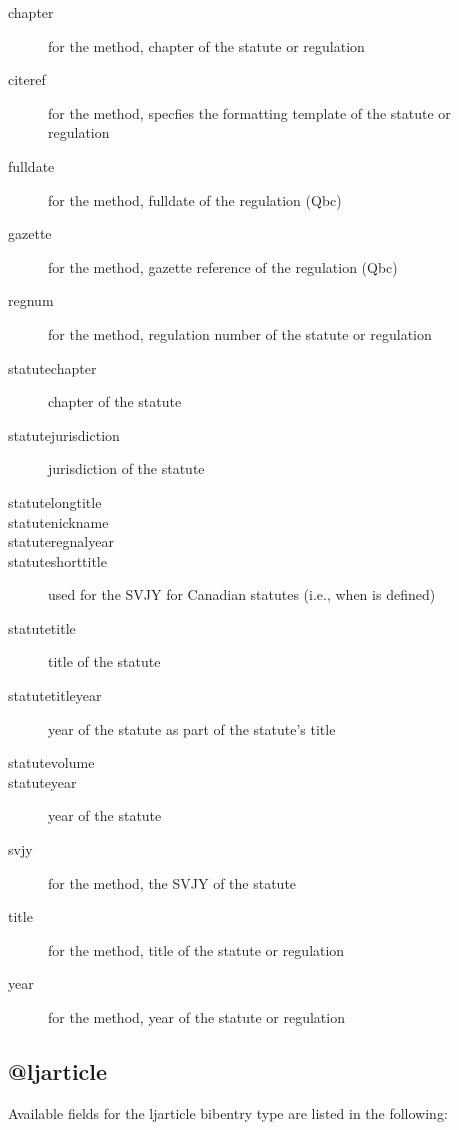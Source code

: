 \begin{description}
\item[chapter]for the  method, chapter of the statute or regulation
\item[citeref]for the  method, specfies the formatting template of the statute or regulation
\item[fulldate]for the  method, fulldate of the regulation (Qbc)
\item[gazette]for the  method, gazette reference of the regulation (Qbc)
\item[regnum]for the  method, regulation number of the statute or regulation
\item[statutechapter]chapter of the statute
\item[statutejurisdiction]jurisdiction of the statute
\item[statutelongtitle]
\item[statutenickname]
\item[statuteregnalyear]
\item[statuteshorttitle]used for the SVJY for Canadian statutes (i.e., when  is defined)
\item[statutetitle]title of the statute
\item[statutetitleyear]year of the statute as part of the statute’s title
\item[statutevolume]
\item[statuteyear]year of the statute
\item[svjy]for the  method, the SVJY  of the statute
\item[title]for the  method, title of the statute or regulation
\item[year]for the  method, year of the statute or regulation
\end{description}



\subsection{@ljarticle}
\p Available fields for the ljarticle bibentry type are listed in the following:

